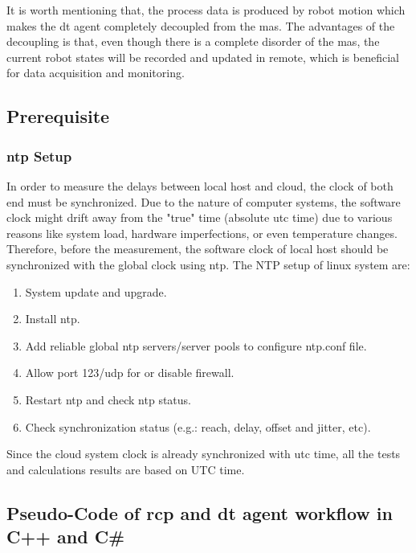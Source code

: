 It is worth mentioning that, the process data is produced by robot motion which makes the \gls{dt} agent completely decoupled from the \gls{mas}. 
The advantages of the decoupling is that, even though there is a complete disorder of the \gls{mas}, the current robot states will be recorded and updated in remote, 
which is beneficial for data acquisition and monitoring. 



\subsection{Prerequisite}
\subsubsection{\gls{ntp} Setup}
In order to measure the delays between local host and cloud, the clock of both end must be synchronized. 
Due to the nature of computer systems, the software clock might drift away from the "true" time (absolute \gls{utc} time) due to various reasons like system load, hardware imperfections, or even temperature changes.
Therefore, before the measurement, the software clock of local host should be synchronized with the global clock using \gls{ntp}. 
The NTP setup of linux system are:  

\begin{enumerate}
    \item System update and upgrade.
    \item Install \gls{ntp}.
    \item Add reliable global \gls{ntp} servers/server pools to configure ntp.conf file.
    \item Allow port 123/udp for or disable firewall.
    \item Restart \gls{ntp} and check \gls{ntp} status.
    \item Check synchronization status (e.g.: reach, delay, offset and jitter, etc).
    \end{enumerate}

Since the cloud system clock is already synchronized with \gls{utc} time, all the tests and calculations results are based on UTC time. 

\subsection{Pseudo-Code of \gls{rcp} and \gls{dt} agent workflow in C++ and C\#}

